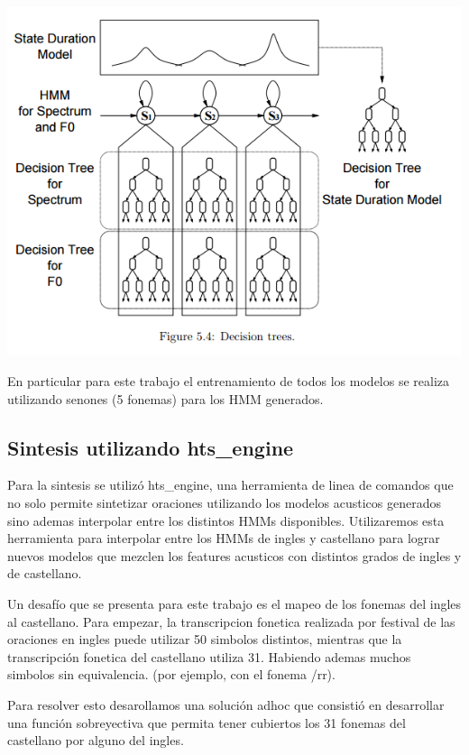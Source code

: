 \includegraphics[scale=0.5]{imagenes/hmmContext.png}


En particular para este trabajo el entrenamiento de todos los modelos se realiza utilizando senones (5 fonemas) para los HMM generados.


\subsection{Sintesis utilizando hts\_engine}


Para la sintesis se utilizó hts\_engine, una herramienta de linea de comandos que no solo permite sintetizar oraciones utilizando los modelos acusticos generados sino ademas interpolar entre los distintos HMMs disponibles. Utilizaremos esta herramienta para interpolar entre los HMMs de ingles y castellano para lograr nuevos modelos que mezclen los features acusticos con distintos grados de ingles y de castellano.

Un desafío que se presenta para este trabajo es el mapeo de los fonemas del ingles al castellano. Para empezar, la transcripcion fonetica realizada por festival de las oraciones en ingles puede utilizar 50 simbolos distintos, mientras que la transcripción fonetica del castellano utiliza 31. Habiendo ademas muchos simbolos sin equivalencia. (por ejemplo, con el fonema /rr).

Para resolver esto desarollamos una solución adhoc que consistió en desarrollar una función sobreyectiva que permita tener cubiertos los 31 fonemas del castellano por alguno del ingles.


